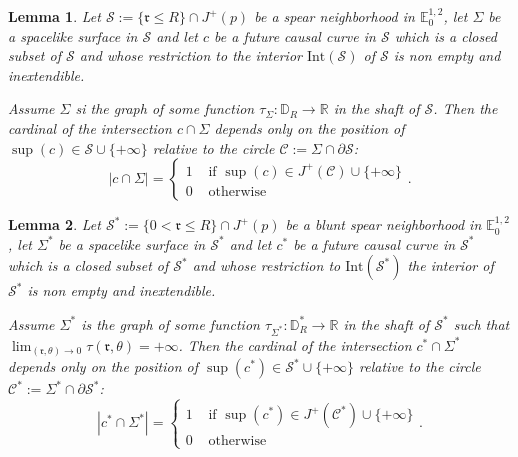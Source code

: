 \documentclass[a4paper,12pt]{article}
\def\r{\mathfrak{r}}
\def\C{\mathcal C}
\def\R{\mathbb{R}}
\def\S{\mathcal S}
\def\S{\mathcal{S}}
\newcommand{\mass}[1]{{\mathbb E}^{1,2}_{#1}}
\newtheorem{lemou}{Lemma}[section]          %
\begin{document}
    \begin{lemou}\label{lem:intersect_number_compact}
      Let $\S := \{\r\leq R\}\cap J^+(p)$ be a spear neighborhood in $\mass{0}$, let $\Sigma$ be a spacelike surface in $\S$  and let $c$ be a future causal curve in $\S$ which is a closed subset of $\S$ and whose restriction to the interior  $\mathrm{Int}(\S)$ of $\S$ is non empty and inextendible. 
      
      Assume $\Sigma$ si the graph of some function $\tau_\Sigma:\mathbb D_R\rightarrow \R$ in the shaft of $\S$.
      Then the cardinal of the intersection $c\cap \Sigma$  depends only on the  position of $\sup(c)\in \S\cup\{+\infty\}$ relative to the circle $\C:=\Sigma\cap \partial \S$: 
      $$|c\cap\Sigma|= \left\{ \begin{array}{ll}
                              1 &  \text{ if } \sup(c) \in J^+(\C)\cup\{+\infty\}\\
                              0& \text{ otherwise }
                             \end{array}
\right. .$$

    \end{lemou}
       \begin{lemou}\label{lem:intersect_number_complete}
      Let $\S^* := \{0<\r\leq R\}\cap J^+(p)$ be a blunt spear neighborhood in $\mass{0}$, let $\Sigma^*$ be a spacelike surface in $\S^*$  and let $c^*$ be a future causal curve in $\S^*$ which is a closed subset of $\S^*$ and whose restriction to $\mathrm{Int}(\S^*)$ the interior of $\S^*$ is non empty and inextendible. 
      
      Assume $\Sigma^*$ is the graph of some function $\tau_{\Sigma^*}:\mathbb D^*_R\rightarrow \R$ in the shaft of $\S^*$ such that $\lim_{(\r,\theta)\rightarrow 0}\tau(\r,\theta)=+\infty$.
      Then the cardinal of the intersection $c^*\cap \Sigma^*$  depends only on the  position of $\sup(c^*)\in \S^*\cup\{+\infty\}$ relative to the circle $\C^*:=\Sigma^*\cap \partial \S^*$: 
      $$|c^*\cap\Sigma^*|= \left\{ \begin{array}{ll}
                              1 &  \text{ if } \sup(c^*) \in J^+(\C^*)\cup\{+\infty\}\\
                              0& \text{ otherwise }
                             \end{array}
\right. .$$

    \end{lemou}
        
\end{document}
